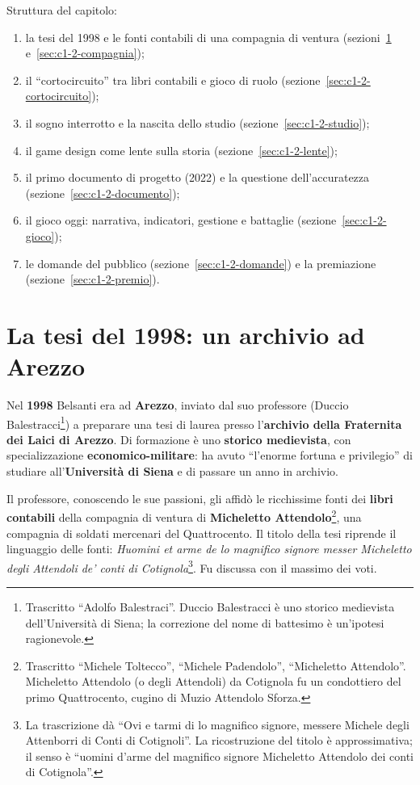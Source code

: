 Struttura del capitolo:
\begin{enumerate}
  \item la tesi del 1998 e le fonti contabili di una compagnia di ventura
        (sezioni~\ref{sec:c1-2-tesi} e~\ref{sec:c1-2-compagnia});
  \item il ``cortocircuito'' tra libri contabili e gioco di ruolo
        (sezione~\ref{sec:c1-2-cortocircuito});
  \item il sogno interrotto e la nascita dello studio
        (sezione~\ref{sec:c1-2-studio});
  \item il game design come lente sulla storia
        (sezione~\ref{sec:c1-2-lente});
  \item il primo documento di progetto (2022) e la questione
        dell'accuratezza (sezione~\ref{sec:c1-2-documento});
  \item il gioco oggi: narrativa, indicatori, gestione e battaglie
        (sezione~\ref{sec:c1-2-gioco});
  \item le domande del pubblico (sezione~\ref{sec:c1-2-domande}) e la
        premiazione (sezione~\ref{sec:c1-2-premio}).
\end{enumerate}

\section{La tesi del 1998: un archivio ad Arezzo}
\label{sec:c1-2-tesi}

Nel \textbf{1998} Belsanti era ad \textbf{Arezzo}, inviato dal suo professore
(Duccio Balestracci\footnote{Trascritto ``Adolfo Balestraci''. Duccio
Balestracci è uno storico medievista dell'Università di Siena; la correzione del
nome di battesimo è un'ipotesi ragionevole.}) a preparare una tesi di laurea
presso l'\textbf{archivio della Fraternita dei Laici di Arezzo}. Di formazione è
uno \textbf{storico medievista}, con specializzazione
\textbf{economico-militare}: ha avuto ``l'enorme fortuna e privilegio'' di
studiare all'\textbf{Università di Siena} e di passare un anno in archivio.

Il professore, conoscendo le sue passioni, gli affidò le ricchissime fonti dei
\textbf{libri contabili} della compagnia di ventura di \textbf{Micheletto
Attendolo}\footnote{Trascritto ``Michele Toltecco'', ``Michele Padendolo'',
``Micheletto Attendolo''. Micheletto Attendolo (o degli Attendoli) da Cotignola
fu un condottiero del primo Quattrocento, cugino di Muzio Attendolo Sforza.},
una compagnia di soldati mercenari del Quattrocento. Il titolo della tesi
riprende il linguaggio delle fonti: \emph{Huomini et arme de lo magnifico
signore messer Micheletto degli Attendoli de' conti di Cotignola}\footnote{La
trascrizione dà ``Ovi e tarmi di lo magnifico signore, messere Michele degli
Attenborri di Conti di Cotignoli''. La ricostruzione del titolo è
approssimativa; il senso è ``uomini d'arme del magnifico signore Micheletto
Attendolo dei conti di Cotignola''.}. Fu discussa con il massimo dei voti.

